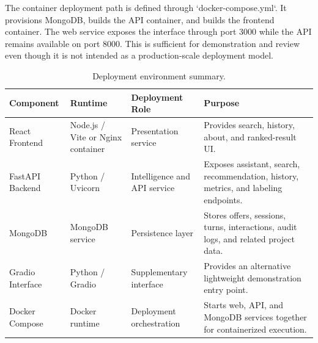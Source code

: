 \documentclass[12pt,a4paper,oneside]{report}
\begin{document}
The container deployment path is defined through `docker-compose.yml`. It provisions MongoDB, builds the API container, and builds the frontend container. The web service exposes the interface through port 3000 while the API remains available on port 8000. This is sufficient for demonstration and review even though it is not intended as a production-scale deployment model.

\begin{table}[H]
\centering
\small
\setlength{\tabcolsep}{4pt}
\renewcommand{\arraystretch}{1.08}
\caption{Deployment environment summary.}
\label{tab:deployment-summary}
\begin{tabular}{|L{0.20\textwidth}|L{0.16\textwidth}|L{0.18\textwidth}|L{0.32\textwidth}|}
\hline
\textbf{Component} & \textbf{Runtime} & \textbf{Deployment Role} & \textbf{Purpose} \\
\hline
React Frontend & Node.js / Vite or Nginx container & Presentation service & Provides search, history, about, and ranked-result UI. \\
\hline
FastAPI Backend & Python / Uvicorn & Intelligence and API service & Exposes assistant, search, recommendation, history, metrics, and labeling endpoints. \\
\hline
MongoDB & MongoDB service & Persistence layer & Stores offers, sessions, turns, interactions, audit logs, and related project data. \\
\hline
Gradio Interface & Python / Gradio & Supplementary interface & Provides an alternative lightweight demonstration entry point. \\
\hline
Docker Compose & Docker runtime & Deployment orchestration & Starts web, API, and MongoDB services together for containerized execution. \\
\hline
\end{tabular}
\end{table}
\end{document}
